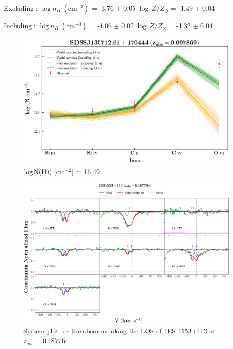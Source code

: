   Excluding  : $\log n_H \ (\text{cm}^{-3})$ = -3.76 $\pm$ 0.05 \hspace{10mm} $\log \ Z/Z_\odot$ = -1.49 $\pm$ 0.04
  
  Including  : $\log n_H \ (\text{cm}^{-3})$ = -4.06 $\pm$ 0.02 \hspace{10mm} $\log \ Z/Z_\odot$ = -1.32 $\pm$ 0.04 \\
  
  \begin{figure}[!h]
      \centering
      \includegraphics[width=0.9\linewidth]{Ionisation-Modelling-Plots/s135712-z=0.097869-compII.png}
      \caption{$\log \text{N}(\ion{H}{i}) \ [\text{cm}^{-2}]=$ 16.49}
  \end{figure}
  
  \restoregeometry
  
  \newpage
  \thispagestyle{empty}

  \begin{landscape}
  
  \begin{figure}
      \centering
      \vspace{-10mm}
      \hspace*{-20mm}
      \includegraphics[width=1.1\linewidth]{System-Plots/1ES1553+113_z=0.187764_sys_plot.png}
      \caption{System plot for the absorber along the LOS of 1ES 1553+113 at $z_{abs} = 0.187764$. }
  \end{figure}
  
  \end{landscape}
  
